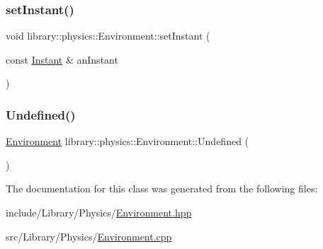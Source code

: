 \mbox{\label{classlibrary_1_1physics_1_1_environment_a6279d44965a3894993cee2bc0c51d068}} 
\subsubsection{\texorpdfstring{set\+Instant()}{setInstant()}}
{\footnotesize\ttfamily void library\+::physics\+::\+Environment\+::set\+Instant (\begin{DoxyParamCaption}\item[{const \hyperlink{classlibrary_1_1physics_1_1time_1_1_instant}{Instant} \&}]{an\+Instant }\end{DoxyParamCaption})}

\mbox{\label{classlibrary_1_1physics_1_1_environment_a8d1dfff3867d59ecdebd3ee6e98a2dab}} 
\subsubsection{\texorpdfstring{Undefined()}{Undefined()}}
{\footnotesize\ttfamily \hyperlink{classlibrary_1_1physics_1_1_environment}{Environment} library\+::physics\+::\+Environment\+::\+Undefined (\begin{DoxyParamCaption}{ }\end{DoxyParamCaption})\hspace{0.3cm}{\ttfamily [static]}}



The documentation for this class was generated from the following files\+:\begin{DoxyCompactItemize}
\item 
include/\+Library/\+Physics/\hyperlink{_environment_8hpp}{Environment.\+hpp}\item 
src/\+Library/\+Physics/\hyperlink{_environment_8cpp}{Environment.\+cpp}\end{DoxyCompactItemize}
